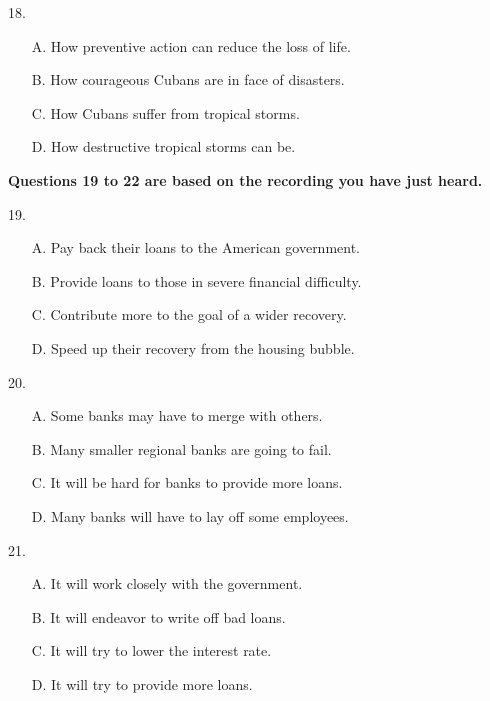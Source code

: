 \documentclass[UTF8,11pt]{ctexart}
\begin{document}
18.


\begin{itemize}[leftmargin=2em,itemsep=.2em,topsep=.4em]\item[A.] How preventive action can reduce the loss of life.
\item[B.] How courageous Cubans are in face of disasters.
\item[C.] How Cubans suffer from tropical storms.
\item[D.] How destructive tropical storms can be.
\end{itemize}

\textbf{Questions 19 to 22 are based on the recording you have just heard.}


19.


\begin{itemize}[leftmargin=2em,itemsep=.2em,topsep=.4em]\item[A.] Pay back their loans to the American government.
\item[B.] Provide loans to those in severe financial difficulty.
\item[C.] Contribute more to the goal of a wider recovery.
\item[D.] Speed up their recovery from the housing bubble.
\end{itemize}

20.


\begin{itemize}[leftmargin=2em,itemsep=.2em,topsep=.4em]\item[A.] Some banks may have to merge with others.
\item[B.] Many smaller regional banks are going to fail.
\item[C.] It will be hard for banks to provide more loans.
\item[D.] Many banks will have to lay off some employees.
\end{itemize}

21.


\begin{itemize}[leftmargin=2em,itemsep=.2em,topsep=.4em]\item[A.] It will work closely with the government.
\end{itemize}

\begin{itemize}[leftmargin=2em,itemsep=.2em,topsep=.4em]\item[B.] It will endeavor to write off bad loans.
\item[C.] It will try to lower the interest rate.
\item[D.] It will try to provide more loans.
\end{itemize}
\end{document}
